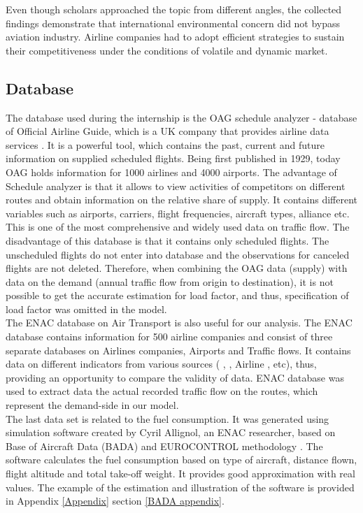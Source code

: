 \documentclass[titlepage, 11pt]{article}
\begin{document}
\tab Even though scholars approached the topic from different angles, the collected findings demonstrate that international environmental concern did not bypass aviation industry. Airline companies had to adopt efficient strategies to sustain their competitiveness under the conditions of volatile and dynamic market.  

\subsection{Database} \label{Database}
\tab The database used during the internship is the OAG schedule analyzer - database of Official Airline Guide, which is a UK company that provides airline data services \cite{OAG}. It is a powerful tool, which contains the past, current and future information on supplied scheduled flights. Being first published in 1929, today OAG holds information for 1000 airlines and 4000 airports. The advantage of Schedule analyzer is that it allows to view  activities of competitors on different routes and obtain information on the relative share of supply. It contains different variables such as airports, carriers, flight frequencies, aircraft types, alliance etc. This is one of the most comprehensive and widely used data on traffic flow. The disadvantage of this database is that it contains only scheduled flights. The unscheduled flights do not enter into database and the observations for canceled flights are not deleted. Therefore, when combining the OAG data (supply) with data on the demand (annual traffic flow from origin to destination), it is not possible to get the accurate estimation for load factor, and thus, specification of load factor was omitted in the model.\\ 
\tab The ENAC database on Air Transport is also useful for our analysis. The ENAC database contains information for 500 airline companies and consist of three separate databases on Airlines companies, Airports and Traffic flows. It contains data on different indicators from various sources (\citeauthor{IATA} \cite{IATA}, \citeauthor{ICAO} \cite{ICAO}, Airline \citeauthor{AirlineMonitor} \cite{AirlineMonitor}, etc), thus, providing an opportunity to compare the validity of data. ENAC database was used to extract data the actual recorded traffic flow on the routes, which represent the demand-side in our model.  \\ 
\tab The last data set is related to the fuel consumption. It was generated using simulation software created by Cyril Allignol, an ENAC researcher, based on Base of Aircraft Data (BADA) and EUROCONTROL methodology \cite{BADA}. The software calculates the fuel consumption based on type of aircraft, distance flown, flight altitude and total take-off weight. It provides good approximation with real values. The example of the estimation and illustration of the software is provided in Appendix \ref{Appendix} section \ref{BADA appendix}.  
\end{document}
